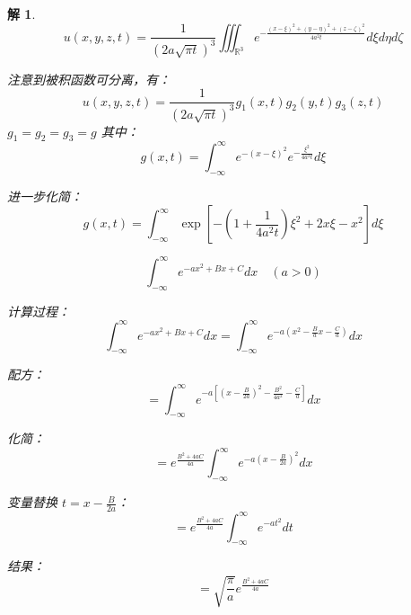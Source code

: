 \documentclass[12pt,a4paper]{article}
\numberwithin{subsection}{section}   %
\numberwithin{subsubsection}{subsection}
\theoremstyle{plain}
\newtheorem{solution}{解}[subsection]  %
\theoremstyle{definition}
\theoremstyle{remark}
\theoremstyle{remark}
\begin{document}
\begin{solution}
\begin{equation}
	u(x, y, z, t) = \frac{1}{(2 a \sqrt{\pi t})^3} \iiint_{\mathbb{R}^3} e^{-\frac{(x - \xi)^2 + (y - \eta)^2 + (z - \zeta)^2}{4 a^2 t}} d\xi d\eta d\zeta
\end{equation}

注意到被积函数可分离，有：
\begin{equation}
	u(x, y, z, t) = \frac{1}{(2 a \sqrt{\pi t})^3} g_1(x, t) g_2(y, t) g_3(z, t) 
\end{equation}
$g_1 = g_2 = g_3 = g$
其中：
\begin{equation}
	g(x, t) = \int_{-\infty}^{\infty} e^{-(x - \xi)^2} e^{-\frac{\xi^2}{4 a^2 t}} d\xi
\end{equation}

进一步化简：
\begin{equation}
	g(x, t) = \int_{-\infty}^{\infty} \exp\left[ -\left(1 + \frac{1}{4 a^2 t}\right) \xi^2 + 2 x \xi - x^2 \right] d\xi
\end{equation}

\begin{equation}
	\int_{-\infty}^{\infty} e^{-a x^2 + B x + C} dx \quad (a > 0)
\end{equation}

计算过程：
\begin{equation}
	\int_{-\infty}^{\infty} e^{-a x^2 + B x + C} dx = \int_{-\infty}^{\infty} e^{-a \left(x^2 - \frac{B}{a} x - \frac{C}{a}\right)} dx
\end{equation}

配方：
\begin{equation}
	= \int_{-\infty}^{\infty} e^{-a \left[\left(x - \frac{B}{2a}\right)^2 - \frac{B^2}{4a^2} - \frac{C}{a}\right]} dx
\end{equation}

化简：
\begin{equation}
	= e^{\frac{B^2 + 4aC}{4a}} \int_{-\infty}^{\infty} e^{-a \left(x - \frac{B}{2a}\right)^2} dx
\end{equation}

变量替换 \( t = x - \frac{B}{2a} \)：
\begin{equation}
	= e^{\frac{B^2 + 4aC}{4a}} \int_{-\infty}^{\infty} e^{-a t^2} dt
\end{equation}

结果：
\begin{equation}
	= \sqrt{\frac{\pi}{a}} e^{\frac{B^2 + 4aC}{4a}}
\end{equation}


\end{solution}
\end{document}

